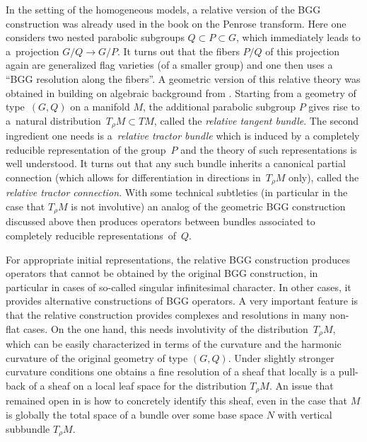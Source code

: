 \documentclass[10pt,a4paper]{amsart}
\numberwithin{equation}{section}
\begin{document}
In the setting of the homogeneous models, a relative version of the BGG construction
was already used in the book \cite{BEastwood} on the Penrose transform. Here one
considers two nested parabolic subgroups $Q\subset P\subset G$, which immediately
leads to a~projection $G/Q\to G/P$. It turns out that the fibers $P/Q$ of this
projection again are generalized flag varieties (of a smaller group) and one then
uses a ``BGG resolution along the fibers''. A geometric version of this relative
theory was obtained in \cite{Rel-BGG2} building on algebraic background from
\cite{Rel-BGG1}. Starting from a geometry of type~$(G,Q)$ on a manifold $M$, the
additional parabolic subgroup $P$ gives rise to a~natural distribution~${T_\rho
M\subset TM}$, called the \textit{relative tangent bundle}. The second ingredient one
needs is a~\textit{relative tractor bundle} which is induced by a completely
reducible representation of the group~$P$ and the theory of such representations is
well understood. It turns out that any such bundle inherits a canonical partial
connection \big(which allows for differentiation in directions in~$T_\rho M$ only\big),
called the \textit{relative tractor connection}. With some technical subtleties \big(in
particular in the case that $T_\rho M$ is not involutive\big) an analog of the geometric
BGG construction discussed above then produces operators between bundles associated
to completely reducible representations~of~$Q$.

For appropriate initial representations, the relative BGG construction produces
operators that cannot be obtained by the original BGG construction, in particular in
cases of so-called singular infinitesimal character. In other cases, it provides
alternative constructions of BGG operators. A very important feature is that the
relative construction provides complexes and resolutions in many non-flat cases. On
the one hand, this needs involutivity of the distribution~$T_\rho M$, which can be
easily characterized in terms of the curvature and the harmonic curvature of the
original geometry of type $(G,Q)$. Under slightly stronger curvature conditions one
obtains a fine resolution of a sheaf that locally is a pull-back of a sheaf on a
local leaf space for the distribution $T_\rho M$. An issue that remained open in
\cite{Rel-BGG2} is how to concretely identify this sheaf, even in the case that $M$
is globally the total space of a bundle over some base space $N$ with vertical
subbundle $T_\rho M$.
\end{document}
